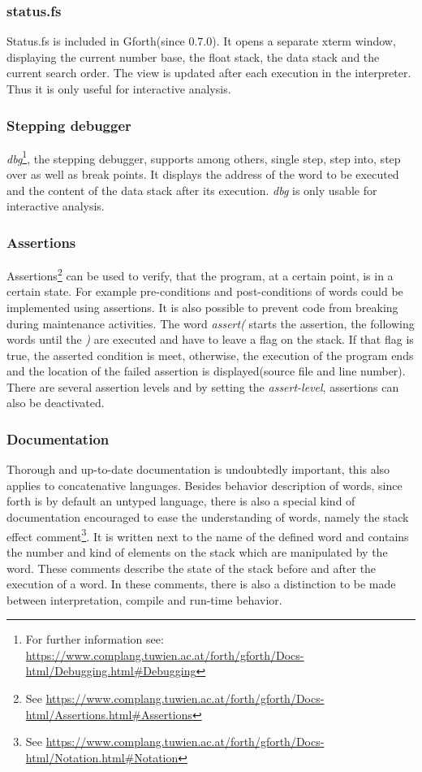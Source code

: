 \subsubsection*{status.fs}
Status.fs is included in Gforth(since 0.7.0). It opens a separate xterm window, displaying the current number base, the float stack, the data stack and the current search order. The view is updated after each execution in the interpreter. Thus it is only useful for interactive analysis.

\subsubsection*{Stepping debugger}
\emph{dbg}\footnote{For further information see: \url{https://www.complang.tuwien.ac.at/forth/gforth/Docs-html/Debugging.html\#Debugging}}, the stepping debugger, supports among others, single step, step into, step over as well as break points. It displays the address of the word to be executed and the content of the data stack after its execution. \emph{dbg} is only usable for interactive analysis.

\subsubsection*{Assertions}
Assertions\footnote{See \url{https://www.complang.tuwien.ac.at/forth/gforth/Docs-html/Assertions.html\#Assertions}} can be used to verify, that the program, at a certain point, is in a certain state. For example pre-conditions and post-conditions of words could be implemented using assertions. It is also possible to prevent code from breaking during maintenance activities. The word \emph{assert(} starts the assertion, the following words until the \emph{)} are executed and have to leave a flag on the stack. If that flag is true, the asserted condition is meet, otherwise, the execution of the program ends and the location of the failed assertion is displayed(source file and line number).\\
There are several assertion levels and by setting the \emph{assert-level}, assertions can also be deactivated.

\subsubsection*{Documentation}
Thorough and up-to-date documentation is undoubtedly important, this also applies to concatenative languages. Besides behavior description of words, since forth is by default an untyped language, there is also a special kind of documentation encouraged to ease the understanding of words, namely the stack effect comment\footnote{See \url{https://www.complang.tuwien.ac.at/forth/gforth/Docs-html/Notation.html\#Notation}}. It is written next to the name of the defined word and contains the number and kind of elements on the stack which are manipulated by the word. These comments describe the state of the stack before and after the execution of a word. In these comments, there is also a distinction to be made between interpretation, compile and run-time behavior.

